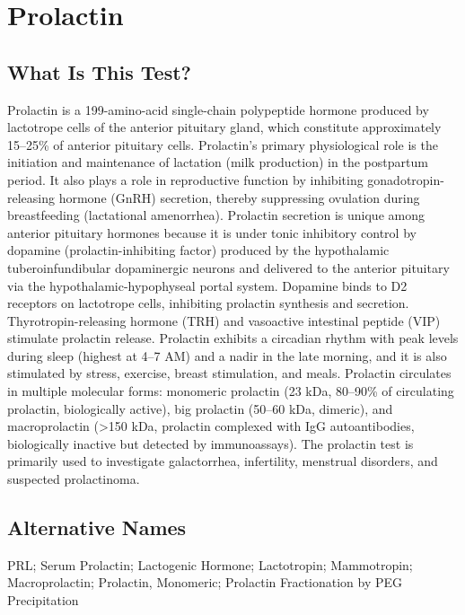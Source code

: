 \chapter{Prolactin}

\section*{What Is This Test?}
Prolactin is a 199-amino-acid single-chain polypeptide hormone produced by lactotrope cells of the anterior pituitary gland, which constitute approximately 15--25\% of anterior pituitary cells. Prolactin's primary physiological role is the initiation and maintenance of lactation (milk production) in the postpartum period. It also plays a role in reproductive function by inhibiting gonadotropin-releasing hormone (GnRH) secretion, thereby suppressing ovulation during breastfeeding (lactational amenorrhea). Prolactin secretion is unique among anterior pituitary hormones because it is under tonic inhibitory control by dopamine (prolactin-inhibiting factor) produced by the hypothalamic tuberoinfundibular dopaminergic neurons and delivered to the anterior pituitary via the hypothalamic-hypophyseal portal system. Dopamine binds to D2 receptors on lactotrope cells, inhibiting prolactin synthesis and secretion. Thyrotropin-releasing hormone (TRH) and vasoactive intestinal peptide (VIP) stimulate prolactin release. Prolactin exhibits a circadian rhythm with peak levels during sleep (highest at 4--7 AM) and a nadir in the late morning, and it is also stimulated by stress, exercise, breast stimulation, and meals. Prolactin circulates in multiple molecular forms: monomeric prolactin (23 kDa, 80--90\% of circulating prolactin, biologically active), big prolactin (50--60 kDa, dimeric), and macroprolactin (>150 kDa, prolactin complexed with IgG autoantibodies, biologically inactive but detected by immunoassays). The prolactin test is primarily used to investigate galactorrhea, infertility, menstrual disorders, and suspected prolactinoma.

\section*{Alternative Names}
PRL; Serum Prolactin; Lactogenic Hormone; Lactotropin; Mammotropin; Macroprolactin; Prolactin, Monomeric; Prolactin Fractionation by PEG Precipitation

